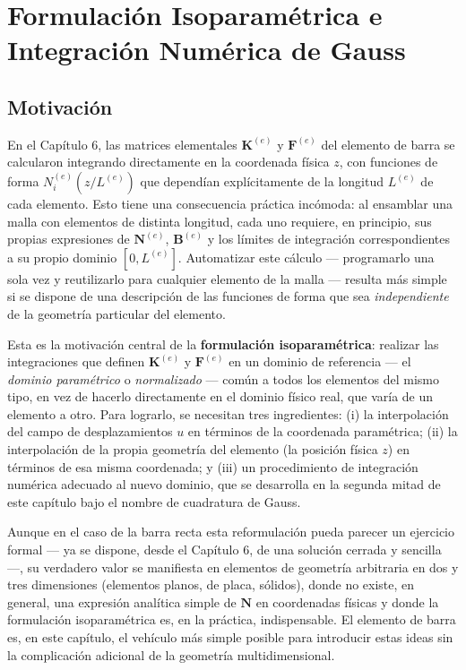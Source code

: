 \chapter{Formulación Isoparamétrica e Integración Numérica de Gauss}
\label{chap:cap08-isoparametrico-gauss}

\section{Motivación}

En el Capítulo 6, las matrices elementales $\bm K^{(e)}$ y $\bm F^{(e)}$ del elemento de barra se calcularon integrando directamente en la coordenada física $z$, con funciones de forma $N_i^{(e)}(z/L^{(e)})$ que dependían explícitamente de la longitud $L^{(e)}$ de cada elemento. Esto tiene una consecuencia práctica incómoda: al ensamblar una malla con elementos de distinta longitud, cada uno requiere, en principio, sus propias expresiones de $\bm N^{(e)}$, $\bm B^{(e)}$ y los límites de integración correspondientes a su propio dominio $[0,L^{(e)}]$. Automatizar este cálculo --- programarlo una sola vez y reutilizarlo para cualquier elemento de la malla --- resulta más simple si se dispone de una descripción de las funciones de forma que sea \emph{independiente} de la geometría particular del elemento.

Esta es la motivación central de la \textbf{formulación isoparamétrica}: realizar las integraciones que definen $\bm K^{(e)}$ y $\bm F^{(e)}$ en un dominio de referencia --- el \emph{dominio paramétrico} o \emph{normalizado} --- común a todos los elementos del mismo tipo, en vez de hacerlo directamente en el dominio físico real, que varía de un elemento a otro. Para lograrlo, se necesitan tres ingredientes: (i) la interpolación del campo de desplazamientos $u$ en términos de la coordenada paramétrica; (ii) la interpolación de la propia geometría del elemento (la posición física $z$) en términos de esa misma coordenada; y (iii) un procedimiento de integración numérica adecuado al nuevo dominio, que se desarrolla en la segunda mitad de este capítulo bajo el nombre de cuadratura de Gauss.

Aunque en el caso de la barra recta esta reformulación pueda parecer un ejercicio formal --- ya se dispone, desde el Capítulo 6, de una solución cerrada y sencilla ---, su verdadero valor se manifiesta en elementos de geometría arbitraria en dos y tres dimensiones (elementos planos, de placa, sólidos), donde no existe, en general, una expresión analítica simple de $\bm N$ en coordenadas físicas y donde la formulación isoparamétrica es, en la práctica, indispensable. El elemento de barra es, en este capítulo, el vehículo más simple posible para introducir estas ideas sin la complicación adicional de la geometría multidimensional.

